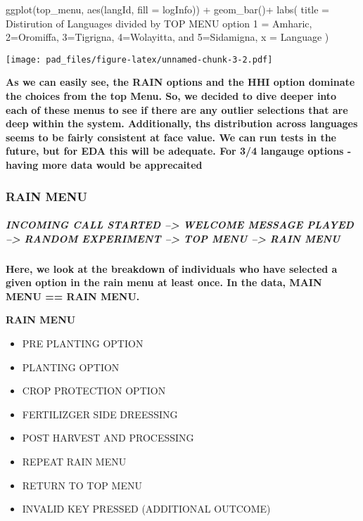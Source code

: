 \documentclass[
]{article}
\newenvironment{Shaded}{\begin{snugshade}}{\end{snugshade}}
\newcommand{\AttributeTok}[1]{\textcolor[rgb]{0.77,0.63,0.00}{#1}}
\newcommand{\FunctionTok}[1]{\textcolor[rgb]{0.00,0.00,0.00}{#1}}
\newcommand{\NormalTok}[1]{#1}
\newcommand{\SpecialCharTok}[1]{\textcolor[rgb]{0.00,0.00,0.00}{#1}}
\newcommand{\StringTok}[1]{\textcolor[rgb]{0.31,0.60,0.02}{#1}}
\providecommand{\tightlist}{%
  \setlength{\itemsep}{0pt}\setlength{\parskip}{0pt}}
\begin{document}
\begin{Shaded}
\begin{Highlighting}[]
\FunctionTok{ggplot}\NormalTok{(top\_menu, }\FunctionTok{aes}\NormalTok{(langId, }\AttributeTok{fill =}\NormalTok{ logInfo)) }\SpecialCharTok{+}
  \FunctionTok{geom\_bar}\NormalTok{()}\SpecialCharTok{+}
  \FunctionTok{labs}\NormalTok{(}
    \AttributeTok{title =} \StringTok{\textquotesingle{}Distirution of Languages divided by TOP MENU option}
\StringTok{    1 = Amharic, 2=Oromiffa, 3=Tigrigna, 4=Wolayitta, and 5=Sidamigna\textquotesingle{}}\NormalTok{,}
    \AttributeTok{x =} \StringTok{\textquotesingle{}Language\textquotesingle{}}
\NormalTok{  )}
\end{Highlighting}
\end{Shaded}

\texttt{[image: pad\_files/figure-latex/unnamed-chunk-3-2.pdf]}

\textbf{As we can easily see, the RAIN options and the HHI option
dominate the choices from the top Menu. So, we decided to dive deeper
into each of these menus to see if there are any outlier selections that
are deep within the system. Additionally, ths distribution across
languages seems to be fairly consistent at face value. We can run tests
in the future, but for EDA this will be adequate. For 3/4 langauge
options - having more data would be apprecaited}

\hypertarget{rain-menu}{%
\subsubsection{RAIN MENU}\label{rain-menu}}

\hypertarget{incoming-call-started-welcome-message-played-random-experiment-top-menu-rain-menu}{%
\subparagraph{INCOMING CALL STARTED --\textgreater{} WELCOME MESSAGE
PLAYED --\textgreater{} RANDOM EXPERIMENT --\textgreater{} TOP MENU
--\textgreater{} RAIN
MENU}\label{incoming-call-started-welcome-message-played-random-experiment-top-menu-rain-menu}}

\textbf{Here, we look at the breakdown of individuals who have selected
a given option in the rain menu at least once. In the data, MAIN MENU ==
RAIN MENU.}

\textbf{RAIN MENU}

\begin{itemize}
\tightlist
\item
  PRE PLANTING OPTION
\item
  PLANTING OPTION
\item
  CROP PROTECTION OPTION
\item
  FERTILIZGER SIDE DREESSING
\item
  POST HARVEST AND PROCESSING
\item
  REPEAT RAIN MENU
\item
  RETURN TO TOP MENU
\item
  INVALID KEY PRESSED (ADDITIONAL OUTCOME)
\end{itemize}
\end{document}
